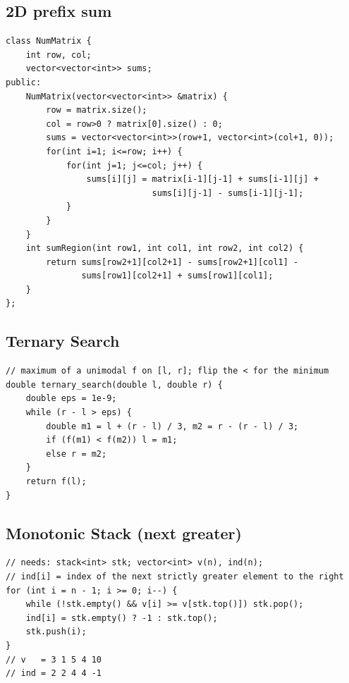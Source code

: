 \subsection{2D prefix sum}
\begin{lstlisting}
class NumMatrix {
    int row, col;
    vector<vector<int>> sums;
public:
    NumMatrix(vector<vector<int>> &matrix) {
        row = matrix.size();
        col = row>0 ? matrix[0].size() : 0;
        sums = vector<vector<int>>(row+1, vector<int>(col+1, 0));
        for(int i=1; i<=row; i++) {
            for(int j=1; j<=col; j++) {
                sums[i][j] = matrix[i-1][j-1] + sums[i-1][j] +
                             sums[i][j-1] - sums[i-1][j-1];
            }
        }
    }
    int sumRegion(int row1, int col1, int row2, int col2) {
        return sums[row2+1][col2+1] - sums[row2+1][col1] -
               sums[row1][col2+1] + sums[row1][col1];
    }
};
\end{lstlisting}
\subsection{Ternary Search}
\begin{lstlisting}
// maximum of a unimodal f on [l, r]; flip the < for the minimum
double ternary_search(double l, double r) {
    double eps = 1e-9;
    while (r - l > eps) {
        double m1 = l + (r - l) / 3, m2 = r - (r - l) / 3;
        if (f(m1) < f(m2)) l = m1;
        else r = m2;
    }
    return f(l);
}
\end{lstlisting}
\subsection{Monotonic Stack (next greater)}
\begin{lstlisting}
// needs: stack<int> stk; vector<int> v(n), ind(n);
// ind[i] = index of the next strictly greater element to the right
for (int i = n - 1; i >= 0; i--) {
    while (!stk.empty() && v[i] >= v[stk.top()]) stk.pop();
    ind[i] = stk.empty() ? -1 : stk.top();
    stk.push(i);
}
// v   = 3 1 5 4 10
// ind = 2 2 4 4 -1
\end{lstlisting}
